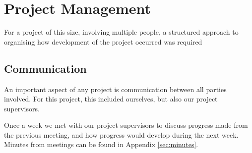 \section{Project Management}
For a project of this size, involving multiple people, a structured approach to organising how development of the project occurred was required

\subsection{Communication}
An important aspect of any project is communication between all parties involved. For this project, this included ourselves, but also our project supervisors.

Once a week we met with our project supervisors to discuss progress made from the previous meeting, and how progress would develop during the next week. Minutes from meetings can be found in Appendix \ref{sec:minutes}.